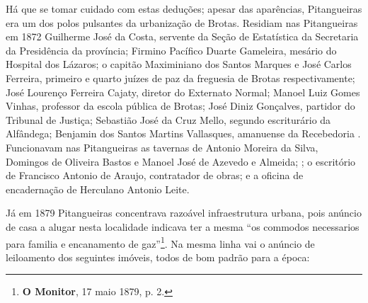 Há que se tomar cuidado com estas deduções; apesar das aparências, Pitangueiras era um dos polos pulsantes da urbanização de Brotas. Residiam nas Pitangueiras em 1872 Guilherme José da Costa, servente da Seção de Estatística da Secretaria da Presidência da província; Firmino Pacífico Duarte Gameleira, mesário do Hospital dos Lázaros; o capitão Maximiniano dos Santos Marques e José Carlos Ferreira, primeiro e quarto juízes de paz da freguesia de Brotas respectivamente; José Lourenço Ferreira Cajaty, diretor do Externato Normal; Manoel Luiz Gomes Vinhas, professor da escola pública de Brotas; José Diniz Gonçalves, partidor do Tribunal de Justiça; Sebastião José da Cruz Mello, segundo escriturário da Alfândega; Benjamin dos Santos Martins Vallasques, amanuense da Recebedoria \cite[segunda~parte, pp.~59, 85, 90, 91, 97, 98, 128, 167, 180]{pimenta_almanak_1872}. Funcionavam nas Pitangueiras as tavernas de Antonio Moreira da Silva, Domingos de Oliveira Bastos e Manoel José de Azevedo e Almeida; \cite[terceira~parte, pp.~40, 41, 48]{pimenta_almanak_1872}; o escritório de Francisco Antonio de Araujo, contratador de obras; e a oficina de encadernação de Herculano Antonio Leite\cite[quarta~parte, pp.~12, 39]{pimenta_almanak_1872}.

Já em 1879 Pitangueiras concentrava razoável infraestrutura urbana, pois anúncio de casa a alugar nesta localidade indicava ter a mesma ``os commodos necessarios para familia e encanamento de gaz''\footnote{\textbf{O Monitor}, 17 maio 1879, p. 2.}. Na mesma linha vai o anúncio de leiloamento dos seguintes imóveis, todos de bom padrão para a época:

